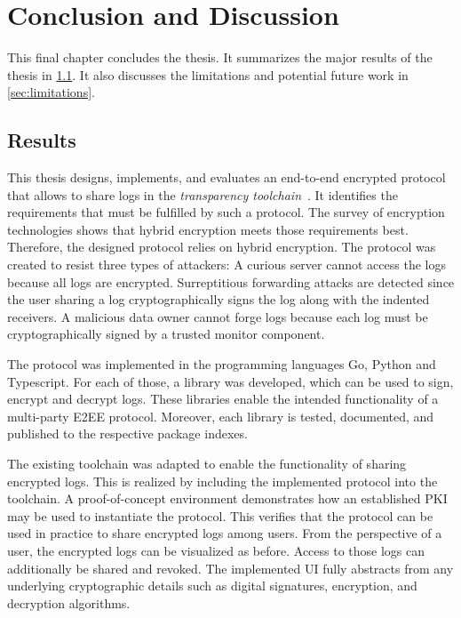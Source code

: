 \documentclass[../main.tex]{subfiles}
\begin{document}
\chapter{Conclusion and Discussion}
\label{chap:conclusion}

This final chapter concludes the thesis.
It summarizes the major results of the thesis in \cref{sec:result}.
It also discusses the limitations and potential future work in \cref{sec:limitations}.

\section{Results}
\label{sec:result}

This thesis designs, implements, and evaluates an end-to-end encrypted protocol that allows to share logs in the \emph{transparency toolchain}~\cite{Zieglmeier2021}.
It identifies the requirements that must be fulfilled by such a protocol.
The survey of encryption technologies shows that hybrid encryption meets those requirements best.
Therefore, the designed protocol relies on hybrid encryption.
The protocol was created to resist three types of attackers: 
A curious server cannot access the logs because all logs are encrypted.
Surreptitious forwarding attacks are detected since the user sharing a log cryptographically signs the log along with the indented receivers.
A malicious data owner cannot forge logs because each log must be cryptographically signed by a trusted monitor component.

The protocol was implemented in the programming languages Go, Python and Typescript.
For each of those, a library was developed, which can be used to sign, encrypt and decrypt logs.
These libraries enable the intended functionality of a multi-party E2EE protocol.
Moreover, each library is tested, documented, and published to the respective package indexes.

The existing toolchain was adapted to enable the functionality of sharing encrypted logs.
This is realized by including the implemented protocol into the toolchain.
A proof-of-concept environment demonstrates how an established PKI may be used to instantiate the protocol.
This verifies that the protocol can be used in practice to share encrypted logs among users.
From the perspective of a user, the encrypted logs can be visualized as before. 
Access to those logs can additionally be shared and revoked.
The implemented UI fully abstracts from any underlying cryptographic details such as digital signatures, encryption, and decryption algorithms.
\end{document}
